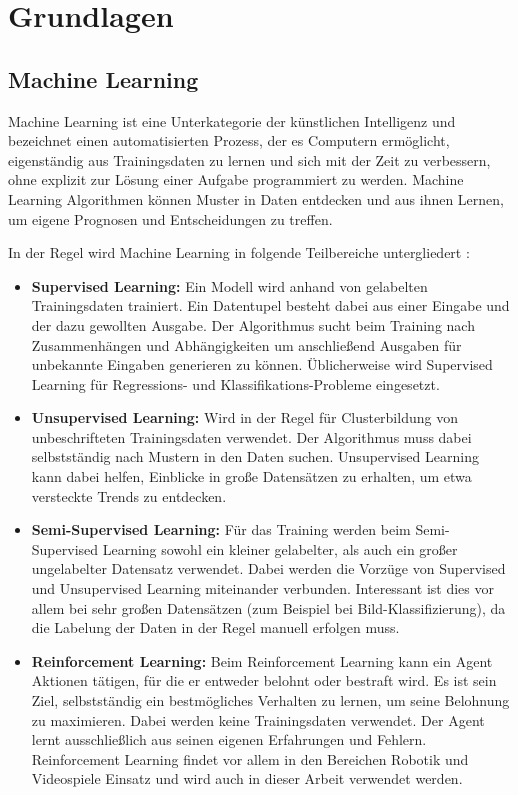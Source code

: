\chapter{Grundlagen}
\section{Machine Learning}
Machine Learning ist eine Unterkategorie der künstlichen Intelligenz und bezeichnet einen automatisierten Prozess, der es Computern ermöglicht, eigenständig aus Trainingsdaten zu lernen und sich mit der Zeit zu verbessern, ohne explizit zur Lösung einer Aufgabe programmiert zu werden.
Machine Learning Algorithmen können Muster in Daten entdecken und aus ihnen Lernen, um eigene Prognosen und Entscheidungen zu treffen.

In der Regel wird Machine Learning in folgende Teilbereiche untergliedert \cite{monkeylearnIntroductionMachine}:
\begin{itemize}
    \item \textbf{Supervised Learning:}
    Ein Modell wird anhand von gelabelten Trainingsdaten trainiert.
    Ein Datentupel besteht dabei aus einer Eingabe und der dazu gewollten Ausgabe.
    Der Algorithmus sucht beim Training nach Zusammenhängen und Abhängigkeiten um anschließend Ausgaben für unbekannte Eingaben generieren zu können.
    Üblicherweise wird Supervised Learning für Regressions- und Klassifikations-Probleme eingesetzt.

    \item \textbf{Unsupervised Learning:}
    Wird in der Regel für Clusterbildung von unbeschrifteten Trainingsdaten verwendet.
    Der Algorithmus muss dabei selbstständig nach Mustern in den Daten suchen.
    Unsupervised Learning kann dabei helfen, Einblicke in große Datensätzen zu erhalten, um etwa versteckte Trends zu entdecken.

    \item \textbf{Semi-Supervised Learning:}
    Für das Training werden beim Semi-Supervised Learning sowohl ein kleiner gelabelter, als auch ein großer ungelabelter Datensatz verwendet.
    Dabei werden die Vorzüge von Supervised und Unsupervised Learning miteinander verbunden.
    Interessant ist dies vor allem bei sehr großen Datensätzen (zum Beispiel bei Bild-Klassifizierung), da die Labelung der Daten in der Regel manuell erfolgen muss.

    \item \textbf{Reinforcement Learning:}
    Beim Reinforcement Learning kann ein Agent Aktionen tätigen, für die er entweder belohnt oder bestraft wird.
    Es ist sein Ziel, selbstständig ein bestmögliches Verhalten zu lernen, um seine Belohnung zu maximieren.
    Dabei werden keine Trainingsdaten verwendet.
    Der Agent lernt ausschließlich aus seinen eigenen Erfahrungen und Fehlern.
    Reinforcement Learning findet vor allem in den Bereichen Robotik und Videospiele Einsatz und wird auch in dieser Arbeit verwendet werden.
\end{itemize}

